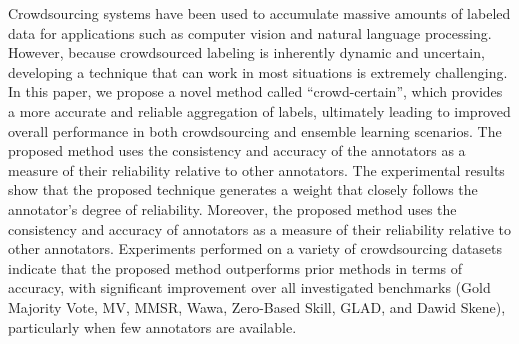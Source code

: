 Crowdsourcing systems have been used to accumulate massive amounts of labeled data for applications such as computer vision and natural language processing. However, because crowdsourced labeling is inherently dynamic and uncertain, developing a technique that can work in most situations is extremely challenging. In this paper, we propose a novel method called ``crowd-certain'', which provides a more accurate and reliable aggregation of labels, ultimately leading to improved overall performance in both crowdsourcing and ensemble learning scenarios. The proposed method uses the consistency and accuracy of the annotators as a measure of their reliability relative to other annotators. The experimental results show that the proposed technique generates a weight that closely follows the annotator's degree of reliability. Moreover, the proposed method uses the consistency and accuracy of annotators as a measure of their reliability relative to other annotators. Experiments performed on a variety of crowdsourcing datasets indicate that the proposed method outperforms prior methods in terms of accuracy, with significant improvement over all investigated benchmarks (Gold Majority Vote, MV, MMSR, Wawa, Zero-Based Skill, GLAD, and Dawid Skene), particularly when few annotators are available.

